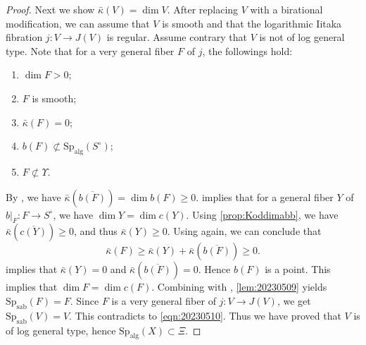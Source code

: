 \documentclass[11pt,english]{smfart}
\theoremstyle{plain}
\theoremstyle{definition}
\theoremstyle{remark}
\numberwithin{equation}{section}
\theoremstyle{plain}
\newcommand{\Spab}{\mathrm{Sp}_{\mathrm{sab}}}
\newcommand{\Spalg}{\mathrm{Sp}_{\mathrm{alg}}}
\begin{document}
\begin{proof}
		Next we show $\bar{\kappa}(V)=\dim V$.
		After replacing $V$ with a birational modification, we can assume that $V$ is smooth and that the logarithmic Iitaka fibration $j:V\to J(V)$ is regular. Assume contrary that $V$ is not of log general type. Note that for a very general fiber $F$ of $j$, the followings hold:
		\begin{enumerate}[label*=(\alph*)]
			\item \label{item:positive} $\dim F>0$;
			\item  $F$ is smooth;
			\item   \label{item:zero}   $\bar{\kappa}(F)=0$;
			\item \label{item:avoid} $b(F)\not\subset \Spalg(S^\circ)$;
			\item \label{item:same dim} $F\not\subset \Upsilon$.   
		\end{enumerate} 
		By , we have $\bar{\kappa}(\overline{b(F)})=\dim b(F)\geq 0$. 
		 implies that for a general fiber $Y$ of $b|_{F}:F\to S^\circ$, we have $\dim Y=\dim c(Y)$. 
		Using \cref{prop:Koddimabb}, we have $\bar{\kappa}(\overline{c(Y)})\geq 0$, and thus $\bar{\kappa}(Y)\geq 0$. 
		Using \cite[Theorem 1.9]{Fuj17} again, we can conclude that $$\bar{\kappa}(F)\geq \bar{\kappa}(Y)+\bar{\kappa}(\overline{b(F)})\geq 0.$$
		 implies that $\bar{\kappa}(Y)=0$ and $\bar{\kappa}(\overline{b(F)})=0$. Hence $b(F)$ is a point. 
		This implies that $\dim F=\dim c(F)$. 
		Combining with , \cref{lem:20230509} yields $\Spab(F)=F$. 
		Since $F$ is a very general fiber of $j:V\to J(V)$, we get $\Spab(V)=V$.
		This contradicts to \eqref{eqn:20230510}.
		Thus we have proved that $V$ is of log general type, hence $\Spalg(X)\subset \Xi$.
	\end{proof}
	
	
	
	
	
	
	
	
	
	
	
	
	
	
	
	
	
	
	
	
	
	
	
	
	
	
	
	
	
	
	
	
	
	
	
\end{document}
